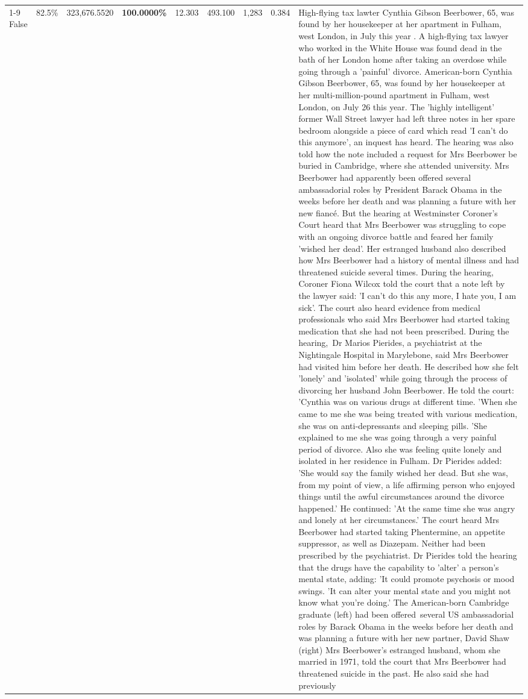 \begin{table}[H]
\begin{tabular}{lllrlllll}
\cline{1-9}
False & 82.5\% & 323,676.5520 & \bfseries \color{red} 100.0000\% & 12.303 & 493.100 & 1,283 & 0.384 & High-flying tax lawter Cynthia Gibson Beerbower, 65, was found by her housekeeper at her apartment in Fulham, west London, in July this year . A high-flying tax lawyer who worked in the White House was found dead in the bath of her London home after taking an overdose while going through a 'painful' divorce. American-born Cynthia Gibson Beerbower, 65, was found by her housekeeper at her multi-million-pound apartment in Fulham, west London, on July 26 this year. The 'highly intelligent' former Wall Street lawyer had left three notes in her spare bedroom alongside a piece of card which read 'I can't do this anymore', an inquest has heard. The hearing was also told how the note included a request for Mrs Beerbower be buried in Cambridge, where she attended university. Mrs Beerbower had apparently been offered several ambassadorial roles by President Barack Obama in the weeks before her death and was planning a future with her new fiancé. But the hearing at Westminster Coroner's Court heard that Mrs Beerbower was struggling to cope with an ongoing divorce battle and feared her family 'wished her dead'. Her estranged husband also described how Mrs Beerbower had a history of mental illness and had threatened suicide several times. During the hearing, Coroner Fiona Wilcox told the court that a note left by the lawyer said: 'I can't do this any more, I hate you, I am sick'. The court also heard evidence from medical professionals who said Mrs Beerbower had started taking medication that she had not been prescribed. During the hearing, Dr Marios Pierides, a psychiatrist at the Nightingale Hospital in Marylebone, said Mrs Beerbower had visited him before her death. He described how she felt 'lonely' and 'isolated' while going through the process of divorcing her husband John Beerbower. He told the court: 'Cynthia was on various drugs at different time. 'When she came to me she was being treated with various medication, she was on anti-depressants and sleeping pills. 'She explained to me she was going through a very painful period of divorce. Also she was feeling quite lonely and isolated in her residence in Fulham. Dr Pierides added: 'She would say the family wished her dead. But she was, from my point of view, a life affirming person who enjoyed things until the awful circumstances around the divorce happened.' He continued: 'At the same time she was angry and lonely at her circumstances.' The court heard Mrs Beerbower had started taking Phentermine, an appetite suppressor, as well as Diazepam. Neither had been prescribed by the psychiatrist. Dr Pierides told the hearing that the drugs have the capability to 'alter' a person's mental state, adding: 'It could promote psychosis or mood swings. 'It can alter your mental state and you might not know what you're doing.' The American-born Cambridge graduate (left) had been offered several US ambassadorial roles by Barack Obama in the weeks before her death and was planning a future with her new partner, David Shaw (right) Mrs Beerbower's estranged husband, whom she married in 1971, told the court that Mrs Beerbower had threatened suicide in the past. He also said she had previously 
\end{tabular}
\end{table}
